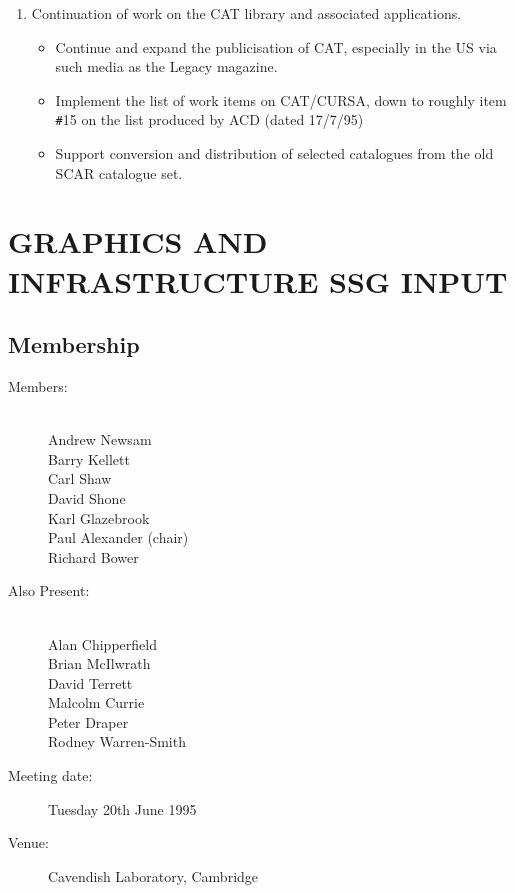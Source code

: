 \begin{enumerate}
\item Continuation of work on the CAT library and associated
applications.

\begin{itemize}     
\item Continue and expand the publicisation of CAT, especially in the
US via such media as the Legacy magazine.

\item Implement the list of work items on CAT/CURSA, down to roughly
item \verb/#/15 on the list produced by ACD (dated 17/7/95)

\item Support conversion and distribution of selected catalogues from 
the old SCAR catalogue set. 

\end{itemize}
\end{enumerate}

\newpage
\section{GRAPHICS AND INFRASTRUCTURE SSG INPUT}

\subsection{Membership}

\begin{description}
\item[Members:]\mbox{}\\
Andrew Newsam\\
Barry Kellett\\
Carl Shaw\\
David Shone\\
Karl Glazebrook\\
Paul Alexander (chair)\\
Richard Bower

\item[Also Present:]\mbox{}\\
Alan Chipperfield\\
Brian McIlwrath\\
David Terrett\\
Malcolm Currie\\
Peter Draper\\
Rodney Warren-Smith

\item[Meeting date:]Tuesday 20th June 1995

\item[Venue:]Cavendish Laboratory, Cambridge
\end{description}

